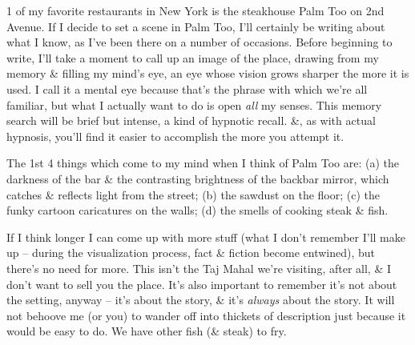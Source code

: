 \documentclass{article}
\numberwithin{equation}{section}
\begin{document}
1 of my favorite restaurants in New York is the steakhouse Palm Too on 2nd Avenue. If I decide to set a scene in Palm Too, I'll certainly be writing about what I know, as I've been there on a number of occasions. Before beginning to write, I'll take a moment to call up an image of the place, drawing from my memory \& filling my mind's eye, an eye whose vision grows sharper the more it is used. I call it a mental eye because that's the phrase with which we're all familiar, but what I actually want to do is open \textit{all} my senses. This memory search will be brief but intense, a kind of hypnotic recall. \&, as with actual hypnosis, you'll find it easier to accomplish the more you attempt it.

The 1st 4 things which come to my mind when I think of Palm Too are: (a) the darkness of the bar \& the contrasting brightness of the backbar mirror, which catches \& reflects light from the street; (b) the sawdust on the floor; (c) the funky cartoon caricatures on the walls; (d) the smells of cooking steak \& fish.

If I think longer I can come up with more stuff (what I don't remember I'll make up -- during the visualization process, fact \& fiction become entwined), but there's no need for more. This isn't the Taj Mahal we're visiting, after all, \& I don't want to sell you the place. It's also important to remember it's not about the setting, anyway -- it's about the story, \& it's \textit{always} about the story. It will not behoove me (or you) to wander off into thickets of description just because it would be easy to do. We have other fish (\& steak) to fry.
\end{document}

